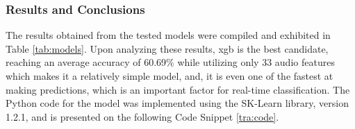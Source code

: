 


\subsubsection{Results and Conclusions}

The results obtained from the tested models were compiled and exhibited in Table \ref{tab:models}. Upon analyzing these results, \ac{xgb} is the best candidate, reaching an average accuracy of 60.69\% while utilizing only 33 audio features which makes it a relatively simple model, and, it is even one of the fastest at making predictions, which is an important factor for real-time classification. The Python code for the model was implemented using the SK-Learn library, version 1.2.1, and is presented on the following  Code Snippet \ref{tra:code}.

\begin{table}[H]
	\centering
	\caption{Tested models' 5-fold cross validation performance on \ac{iemo}.}
	\label{tab:models}
\end{table}


